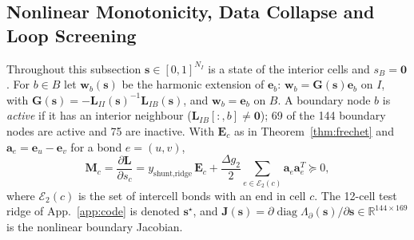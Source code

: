 \documentclass[11pt,a4paper]{article}
\theoremstyle{definition}
\theoremstyle{remark}
\begin{document}
\subsection{Nonlinear Monotonicity, Data Collapse and Loop Screening}\label{sec:nonlin}
Throughout this subsection $\mathbf{s}\in[0,1]^{N_I}$ is a state of the interior cells and $s_B = \mathbf{0}$. For $b\in B$ let $\mathbf{w}_b(\mathbf{s})$ be the harmonic extension of $\mathbf{e}_b$: $\mathbf{w}_b = \mathbf{G}(\mathbf{s})\mathbf{e}_b$ on $I$, with $\mathbf{G}(\mathbf{s}) = -\mathbf{L}_{II}(\mathbf{s})^{-1}\mathbf{L}_{IB}(\mathbf{s})$, and $\mathbf{w}_b = \mathbf{e}_b$ on $B$. A boundary node $b$ is \emph{active} if it has an interior neighbour ($\mathbf{L}_{IB}[:,b]\neq\mathbf{0}$); 69 of the 144 boundary nodes are active and 75 are inactive. With $\mathbf{E}_c$ as in Theorem~\ref{thm:frechet} and $\mathbf{a}_e = \mathbf{e}_u-\mathbf{e}_v$ for a bond $e = (u,v)$,
\begin{equation}\label{eq:Mc}
\mathbf{M}_c = \frac{\partial\mathbf{L}}{\partial s_c} = y_{\text{shunt,ridge}}\,\mathbf{E}_c + \frac{\Delta g_2}{2}\sum_{e\in\mathcal{E}_2(c)}\mathbf{a}_e\mathbf{a}_e^T \succeq 0,
\end{equation}
where $\mathcal{E}_2(c)$ is the set of intercell bonds with an end in cell $c$. The 12-cell test ridge of App.~\ref{app:code} is denoted $\mathbf{s}^\star$, and $\mathbf{J}(\mathbf{s}) = \partial\operatorname{diag}\Lambda_\partial(\mathbf{s})/\partial\mathbf{s}\in\mathbb{R}^{144\times169}$ is the nonlinear boundary Jacobian.
\end{document}
